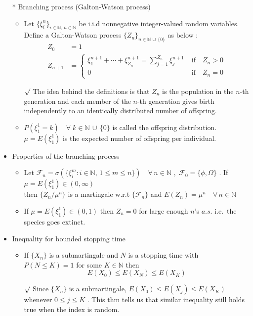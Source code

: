 \documentclass[12pt, A4]{article}
\newcommand{\rmk}{$\surd$}
\newcommand{\N}{\mathbb{N}}
\newcommand{\F}{\mathcal{F}}
\newcommand{\union}{\,\cup\,}
\newcommand{\foranyn}{\quad \forall \, n\in \N}
\begin{document}
\begin{itemize}
\begin{itemize}
\begin{itemize}
		\end{itemize}
	\end{itemize}
	\item[*] Branching process (Galton-Watson process)
	\begin{itemize}
		\item Let $\{\xi_i^n\}_{i\in \N,\, n\in \N}$ be i.i.d nonnegative integer-valued random variables. \\Define a Galton-Watson process $\{Z_n\}_{n\in \N\union \{0\}}$ as below : 
		\begin{align*}
			Z_0 &=1 \\
			Z_{n+1} &= \begin{cases}
				\xi_1^{n+1}+\cdots+\xi_{Z_n}^{n+1}=\sum_{j=1}^{Z_n}\xi_j^{n+1} & \;\text{if}\quad Z_n>0 \\
				0 & \;\text{if}\quad Z_n=0
			\end{cases}
		\end{align*}
		\item[\rmk] The idea behind the definitions is that $Z_n$ is the population in the $n$-th generation and each member of the $n$-th generation gives birth independently to an identically distributed number of offspring.
		\item $P(\xi_1^1=k)\quad \forall \;k\in\N\union\{0\}$ is called the offspring distribution. $\mu=E(\xi_1^1)$ is the expected number of offspring per individual.   
	\end{itemize}
	\item Properties of the branching process
	\begin{itemize}
		\item Let $\F_n=\sigma(\{\xi_i^m : i\in\N,\, 1\leq m\leq n\})\foranyn$ ,\, $\F_0=\{\phi, \Omega\}$ . If $\mu=E(\xi_1^1)\in (0,\infty)$ \\ then $\{Z_n/\mu^n\}$ is a martingale w.r.t $\{\F_n\}$ and $E(Z_n)=\mu^n\foranyn$
		\item If $\mu=E(\xi_1^1)\in(0,1)$ then $Z_n=0$ for large enough $n$'s $a.s.$ \;i.e.\, the species goes extinct.
	\end{itemize}
	\item Inequality for bounded stopping time
	\begin{itemize}
		\item If $\{X_n\}$ is a submartingale and $N$ is a stopping time with $P(N\leq K)=1$ for some $K\in \N$ then $$E(X_0)\leq E(X_N)\leq E(X_K) $$
		\item[\rmk] Since $\{X_n\}$ is a submartingale, $E(X_0)\leq E(X_j)\leq E(X_K)$ whenever $0\leq j\leq K$ . This thm tells us that similar inequality still holds true when the index is random. 

\end{itemize}
\end{itemize}
\end{document}
